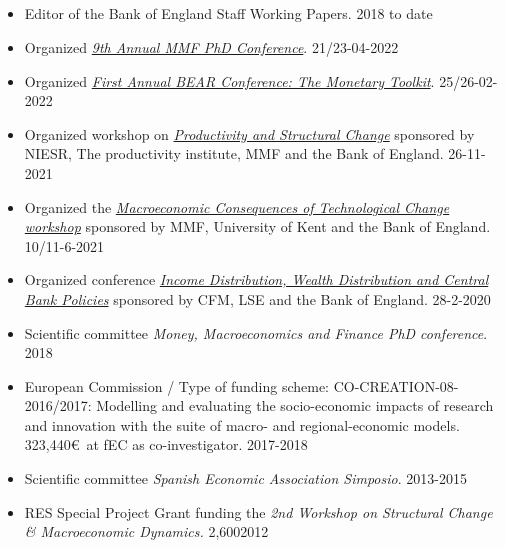 \documentclass[margin, 11pt]{res} %
\begin{document}
\begin{resume}


\section{}
\begin{itemize}
\item Editor of the Bank of England Staff Working Papers. \hfill 2018 to date
\item Organized \emph{\href{https://www.mmf.ac.uk/phd/2022-phd-conference/}{9th Annual MMF PhD Conference}}. \hfill 21/23-04-2022
\item Organized \emph{\href{https://www.bankofengland.co.uk/events/2022/february/first-annual-bear-conference}{First Annual BEAR Conference: The Monetary Toolkit}}. \hfill 25/26-02-2022
\item Organized workshop on \emph{\href{https://www.mmf.ac.uk/productivity-workshop/}{Productivity and Structural Change}} sponsored by NIESR, The productivity institute, MMF and the Bank of England. \hfill 26-11-2021
\item Organized the  \emph{\href{https://www.bankofengland.co.uk/events/2021/may/mmf-workshop-on-macroeconomic-consequences-of-technological-change}{Macroeconomic Consequences of Technological Change workshop}} sponsored by MMF, University of Kent and the Bank of England. \hfill 10/11-6-2021
\item Organized conference \emph{\href{https://www.dropbox.com/s/vfv3qz5ixi32ywf/Programme.pdf?dl=0}{Income Distribution, Wealth Distribution and Central Bank Policies}} sponsored by CFM, LSE and the Bank of England. \hfill 28-2-2020
\item Scientific committee \emph{Money, Macroeconomics and Finance PhD conference}. \hfill 2018
\item European Commission / Type of funding scheme: CO-CREATION-08-2016/2017: Modelling and evaluating the socio-economic impacts of research and innovation with the suite of macro- and regional-economic models. 323,440\euro$\,$  at fEC  as co-investigator. \hfill 2017-2018
\item Scientific committee \emph{Spanish Economic Association Simposio}. \hfill 2013-2015
\item RES Special Project Grant funding the \emph{2nd Workshop on Structural Change \& Macroeconomic Dynamics.} 2,600\textsterling \hfill 2012

\end{itemize}
\end{resume}
\end{document}
